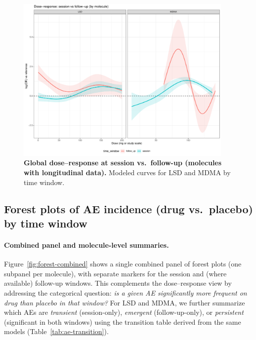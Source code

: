 \begin{figure}[htb]
  \centering
  \includegraphics[width=0.94\textwidth]{figures/dr_session_vs_followup.pdf}
  \caption{\textbf{Global dose–response at session vs.\ follow-up (molecules with longitudinal data).}
  Modeled curves for LSD and MDMA by time window.}
  \label{fig:dr-session-followup}
\end{figure}


\subsection{Forest plots of AE incidence (drug vs.\ placebo) by time window}

\paragraph{Combined panel and molecule-level summaries.}
Figure~\ref{fig:forest-combined} shows a single combined panel of forest plots (one subpanel per molecule), with separate markers for the session and (where available) follow-up windows. This complements the dose–response view by addressing the categorical question: \emph{is a given AE significantly more frequent on drug than placebo in that window?} For LSD and MDMA, we further summarize which AEs are \emph{transient} (session-only), \emph{emergent} (follow-up-only), or \emph{persistent} (significant in both windows) using the transition table derived from the same models (Table~\ref{tab:ae-transition}).

